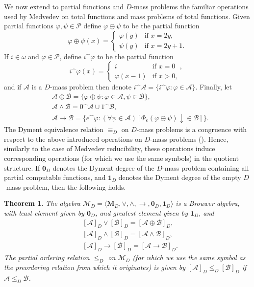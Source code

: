 \documentclass[11pt]{amsart}
\renewcommand{\phi}{\varphi}
\newtheorem{theorem}{Theorem}[section]
\newcommand{\imp}{\rightarrow}
\newcommand{\cat}[2]{#1\widehat{\phantom{\alpha}}\!#2}
\newcommand{\MP}[1]{\ensuremath{\mathcal{#1}}}
\begin{document}
We now extend to partial functions and $D$-mass problems the familiar 
operations used by Medvedev on total functions and mass problems of total 
functions. Given partial functions $\phi, \psi \in \mathcal{P}$ define $\phi 
\oplus \psi$ to be the partial function 
\[
\phi \oplus \psi(x)=
\begin{cases}
 \phi(y)     & \text{if $x=2y$}, \\
 \psi(y)   & \text{if $x=2y+1$}.
\end{cases}
\]
If $i\in \omega$ and $\phi\in \mathcal{P}$, define $\cat{i}{\phi}$ to be the
partial function
\[
\cat{i}{\phi}(x)=
\begin{cases}
i  & \text{if $x=0$ }, \\
\phi(x-1)  & \text{if $x>0$},
\end{cases}
\]
and if $\MP{A}$ is a $D$-mass  problem then denote $\cat{i}{\MP{A}}=
\{\cat{i}{\phi}: \phi \in \MP{A}\}$. Finally, let
\begin{align*}
&\MP{A} \oplus  \MP{B}=\{\phi \oplus \psi: \phi\in \MP{A}, \psi \in \MP{B}\},\\
&\MP{A} \wedge \MP{B}=\cat{0}{\MP{A}} \cup \cat{1}{\MP{B}},\\
&\MP{A} \imp \MP{B}=\{\cat{e}{\phi}:
        (\forall \psi\in \MP{A})[\Phi_{e}(\phi\oplus \psi)\downarrow \in
        \MP{B}]\}.
\end{align*}
The Dyment equivalence relation $\equiv_D$ on $D$-mass  problems is a 
congruence with respect to the above introduced operations on $D$-mass  
problems (\cite{Dyment:Someproperties}). Hence, similarly to the case of 
Medvedev reducibility, these operations induce corresponding operations (for 
which we use the same symbols) in the quotient structure. If $\mathbf{0}_{D}$ 
denotes the Dyment degree of the $D$-mass  problem containing all partial 
computable functions, and $\mathbf{1}_{D}$ denotes the Dyment degree of the 
empty $D$-mass  problem, then the following holds. 

\begin{theorem}
The algebra $\mathscr{M}_{D}= \langle \textbf{M}_{D}, \lor, \wedge, 
\rightarrow, \mathbf{0}_{D}, \mathbf{1}_{D}\rangle$ is a Brouwer algebra, 
with least element given by $\mathbf{0}_{D}$, and greatest element given by  
$\mathbf{1}_{D}$, and 
\begin{align*}
&[\MP{A}]_{D} \lor [\MP{B}]_{D}=[\MP{A}\oplus  \MP{B}]_{D},\\
&[\MP{A}]_{D} \wedge [\MP{B}]_{D}=[\MP{A} \wedge \MP{B}]_{D},\\
&[\MP{A}]_{D} \imp [\MP{B}]_{D}=[\MP{A} \imp \MP{B}]_{D}.
\end{align*}
The partial ordering relation $\le_{D}$ on $\mathscr{M}_{D}$ (for which we 
use the same symbol as the preordering relation from which it originates) is 
given by $[\MP{A}]_{D}\le_{D} [\MP{B}]_{D}$ if $\MP{A}\leq_{D} \MP{B}$. 
\end{theorem}
\end{document}
